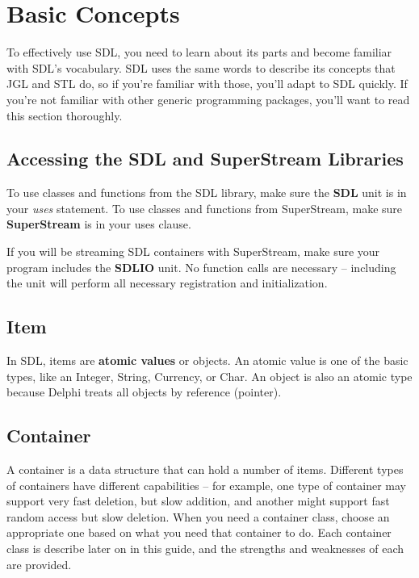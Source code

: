 \documentclass{report}
\begin{document}
\chapter{Basic Concepts}

To effectively use SDL, you need to learn about its parts and become
familiar with SDL's vocabulary. SDL uses the same words to describe its
concepts that JGL and STL do, so if you're familiar with those, you'll adapt
to SDL quickly. If you're not familiar with other generic programming
packages, you'll want to read this section thoroughly.

\section{Accessing the SDL and SuperStream Libraries}

To use classes and functions from the SDL library, make sure the \textbf{SDL}
unit is in your \emph{uses} statement. To use classes and functions from
SuperStream, make sure \textbf{SuperStream} is in your uses clause.

If you will be streaming SDL containers with SuperStream, make sure your
program includes the \textbf{SDLIO} unit. No function calls are necessary --
including the unit will perform all necessary registration and
initialization.

\section{Item}

In SDL, items are \textbf{atomic values} or objects. An atomic value is one
of the basic types, like an Integer, String, Currency, or Char. An object is
also an atomic type because Delphi treats all objects by reference
(pointer).

\section{Container}

A container is a data structure that can hold a number of items. Different
types of containers have different capabilities -- for example, one type of
container may support very fast deletion, but slow addition, and another
might support fast random access but slow deletion. When you need a
container class, choose an appropriate one based on what you need that
container to do. Each container class is describe later on in this guide,
and the strengths and weaknesses of each are provided.
\end{document}
